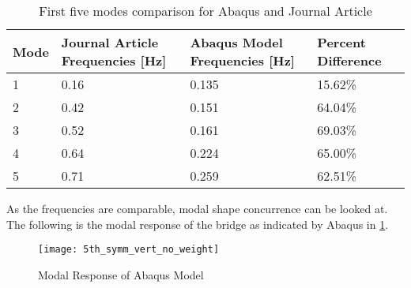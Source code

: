 \begin{table}
\begin{tabular}{|l|l|l|l|}
\hline
Mode &  Journal Article Frequencies [Hz] & Abaqus Model Frequencies [Hz]  & Percent Difference   \\
\hline
1    & 0.16                          & 0.135                              & 15.62\%                \\
2    & 0.42                          & 0.151                           	  & 64.04\%                \\
3    & 0.52                          & 0.161                              & 69.03\%              \\
4    & 0.64                          & 0.224                              & 65.00\%            \\
5    & 0.71                          & 0.259                              & 62.51\%          \\
\hline
\end{tabular}
\caption{First five modes comparison for Abaqus and Journal Article}
\label{tab:FirstFive}
\end{table}

As the frequencies are comparable, modal shape concurrence can be looked at. The following is the modal response of the bridge as indicated by Abaqus in \ref{fig:ABAQUS_Chris}. 

\begin{figure}[h]
\centering
\texttt{[image: 5th\_symm\_vert\_no\_weight]}
\caption{Modal Response of Abaqus Model}
\label{fig:ABAQUS_Chris}
\end{figure}
